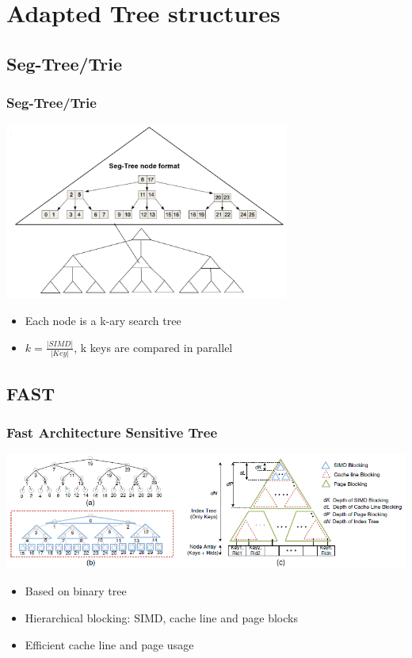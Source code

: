 \documentclass{beamer}
\begin{document}
\section{Adapted Tree structures}

\subsection{Seg-Tree/Trie}
\begin{frame}
\frametitle{Seg-Tree/Trie}
\begin{center}
	\includegraphics[width=0.7\textwidth]{img/seg_tree2.png}
\end{center}
\begin{itemize}
	\item Each node is a k-ary search tree
	\item $k = \frac{\vert SIMD \vert }{\vert Key \vert}$, k keys are compared in parallel
\end{itemize}
\end{frame}
\subsection{FAST}
\begin{frame}
\frametitle{Fast Architecture Sensitive Tree}
\begin{center}
	\includegraphics[width=1.05\textwidth]{img/fast.png}
\end{center}
\begin{itemize}
	\item Based on binary tree
	\item Hierarchical blocking: SIMD, cache line and page blocks
	\item Efficient cache line and page usage
\end{itemize}
\end{frame}
\end{document}
